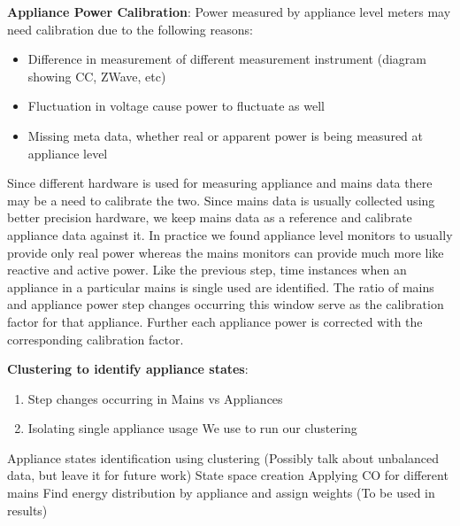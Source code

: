 \documentclass[conference]{IEEEtran}
\begin{document}
\textbf{Appliance Power Calibration}: 
Power measured by appliance level meters may need calibration due to the following reasons:
\begin{itemize}
\item Difference in measurement of different measurement instrument (diagram showing CC, ZWave, etc)
\item Fluctuation in voltage cause power to fluctuate as well
\item Missing meta data, whether real or apparent power is being measured at appliance level

\end{itemize}Since different hardware is used for measuring appliance and mains data there may be a need to calibrate the two. Since mains data is usually collected using better precision hardware, we keep mains data as a reference and calibrate appliance data against it. In practice we found appliance level monitors to usually provide only real power whereas the mains monitors can provide much more like reactive and active power. Like the previous step, time instances when an appliance in a particular mains is single used are identified. The ratio of mains and appliance power step changes occurring this window serve as the calibration factor for that appliance. Further each appliance power is corrected with the corresponding calibration factor.

\textbf{Clustering to identify appliance states}:
\begin{enumerate}
\item Step changes occurring in Mains vs Appliances
\item Isolating single appliance usage
We use \cite{kmeansplusplus} to run our clustering
\end{enumerate}
Appliance states identification using clustering (Possibly talk about unbalanced data, but leave it for future work)
State space creation
Applying CO for different mains
Find energy distribution by appliance and assign weights (To be used in results)
\end{document}
